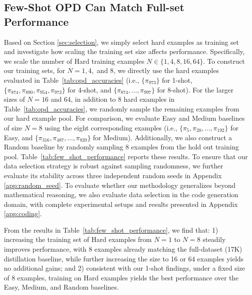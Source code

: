 
\subsection{Few-Shot OPD Can Match Full-set Performance}
\label{subsubsec:few_shot_scaling}

Based on Section \ref{sec:selection}, we simply select hard examples as training set and investigate how scaling the training set size affects performance. Specifically, we scale the number of Hard training examples $N \in \{1, 4, 8, 16, 64\}$. To construct our training sets, for $N = 1, 4,$ and $8$, we directly use the hard examples evaluated in Table~\ref{tab:opd_accuracies} (i.e., $\{\pi_{973}\}$ for 1-shot, $\{\pi_{874}, \pi_{890}, \pi_{954}, \pi_{973}\}$ for 4-shot, and $\{\pi_{874}, \dots, \pi_{997}\}$ for 8-shot). For the larger sizes of $N = 16$ and $64$, in addition to 8 hard examples in Table~\ref{tab:opd_accuracies}, we randomly sample the remaining examples from our hard example pool. For comparison, we evaluate Easy and Medium baselines of size $N=8$ using the eight corresponding examples (i.e., $\{ \pi_{5}, \pi_{20},\dots, \pi_{192}\}$ for Easy, and $\{\pi_{316}, \pi_{487}, \dots, \pi_{820}\}$ for Medium). Additionally, we also construct a Random baseline by randomly sampling 8 examples from the hold out training pool. Table~\ref{tab:few_shot_performance} reports these results. To ensure that our data selection strategy is robust against sampling randomness, we further evaluate its stability across three independent random seeds in Appendix \ref{app:random_seed}. To evaluate whether our methodology generalizes beyond mathematical reasoning, we also evaluate data selection in the code generation domain, with complete experimental setups and results presented in Appendix \ref{app:coding}.

From the results in Table~\ref{tab:few_shot_performance}, we find that: 1) increasing the training set of Hard examples from $N=1$ to $N=8$ steadily improves performance, with 8 examples already matching the full-dataset (17K) distillation baseline, while further increasing the size to 16 or 64 examples yields no additional gains; and 2) consistent with our 1-shot findings, under a fixed size of 8 examples, training on Hard examples yields the best performance over the Easy, Medium, and Random baselines.

